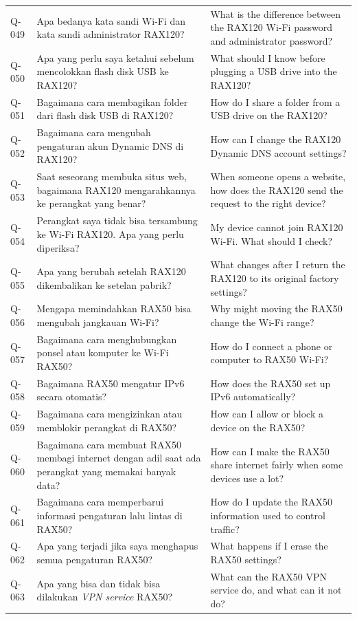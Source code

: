 \begin{longtable}{@{}>{\RaggedRight\arraybackslash}p{1.6cm}>{\RaggedRight\arraybackslash}p{5.8cm}>{\RaggedRight\arraybackslash}p{\dimexpr\textwidth-1.6cm-5.8cm-4\tabcolsep\relax}@{}}
Q-049 & Apa bedanya kata sandi Wi-Fi dan kata sandi administrator RAX120? & What is the difference between the RAX120 Wi-Fi password and administrator password? \\
Q-050 & Apa yang perlu saya ketahui sebelum mencolokkan flash disk USB ke RAX120? & What should I know before plugging a USB drive into the RAX120? \\
Q-051 & Bagaimana cara membagikan folder dari flash disk USB di RAX120? & How do I share a folder from a USB drive on the RAX120? \\
Q-052 & Bagaimana cara mengubah pengaturan akun Dynamic DNS di RAX120? & How can I change the RAX120 Dynamic DNS account settings? \\
Q-053 & Saat seseorang membuka situs web, bagaimana RAX120 mengarahkannya ke perangkat yang benar? & When someone opens a website, how does the RAX120 send the request to the right device? \\
Q-054 & Perangkat saya tidak bisa tersambung ke Wi-Fi RAX120. Apa yang perlu diperiksa? & My device cannot join RAX120 Wi-Fi. What should I check? \\
Q-055 & Apa yang berubah setelah RAX120 dikembalikan ke setelan pabrik? & What changes after I return the RAX120 to its original factory settings? \\
Q-056 & Mengapa memindahkan RAX50 bisa mengubah jangkauan Wi-Fi? & Why might moving the RAX50 change the Wi-Fi range? \\
Q-057 & Bagaimana cara menghubungkan ponsel atau komputer ke Wi-Fi RAX50? & How do I connect a phone or computer to RAX50 Wi-Fi? \\
Q-058 & Bagaimana RAX50 mengatur IPv6 secara otomatis? & How does the RAX50 set up IPv6 automatically? \\
Q-059 & Bagaimana cara mengizinkan atau memblokir perangkat di RAX50? & How can I allow or block a device on the RAX50? \\
Q-060 & Bagaimana cara membuat RAX50 membagi internet dengan adil saat ada perangkat yang memakai banyak data? & How can I make the RAX50 share internet fairly when some devices use a lot? \\
Q-061 & Bagaimana cara memperbarui informasi pengaturan lalu lintas di RAX50? & How do I update the RAX50 information used to control traffic? \\
Q-062 & Apa yang terjadi jika saya menghapus semua pengaturan RAX50? & What happens if I erase the RAX50 settings? \\
Q-063 & Apa yang bisa dan tidak bisa dilakukan \emph{VPN service} RAX50? & What can the RAX50 VPN service do, and what can it not do? \\

\end{longtable}
